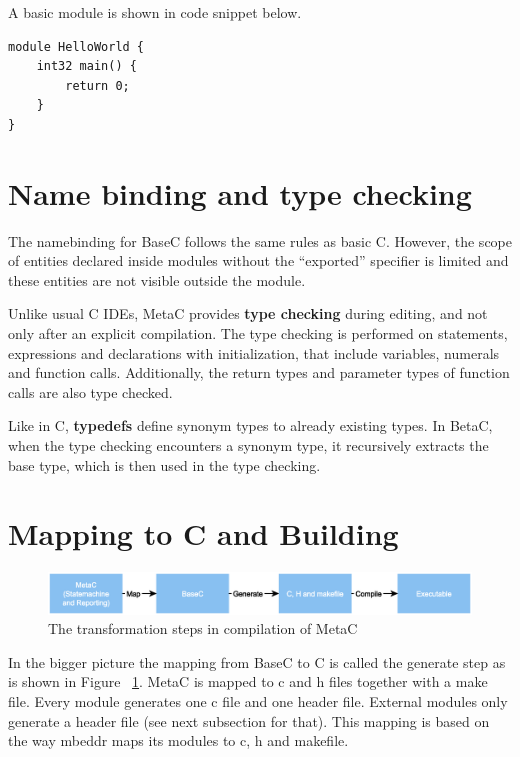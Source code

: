 \documentclass[a4paper,10pt,titlepage]{report}
\begin{document}
A basic module is shown in code snippet below.

\begin{lstlisting}
module HelloWorld {
    int32 main() {
        return 0;
    }
}
\end{lstlisting}



\section{Name binding and type checking}
The namebinding for BaseC follows the same rules as basic C. However, the scope of entities declared inside modules without the “exported” specifier is limited and these entities are not visible outside the module.

Unlike usual C IDEs, MetaC provides \textbf{type checking} during editing, and not only after an explicit compilation. The type checking is performed on statements, expressions and declarations with initialization, that include variables, numerals and function calls. Additionally, the return types and parameter types of function calls are also type checked.

Like in C, \textbf{typedefs} define synonym types to already existing types. In BetaC, when the type checking encounters a synonym type, it recursively extracts the base type, which is then used in the type checking.
 

\section{Mapping to C and Building}

\begin{figure}[ht!]
\centering
\includegraphics[width=\linewidth]{pics/compilation_simple.eps}
\caption{The transformation steps in compilation of MetaC}
\label{fig:compilation_simple}
\end{figure}

In the bigger picture the mapping from BaseC to C is called the generate step as is shown in Figure ~\ref{fig:compilation_simple}. MetaC is mapped to c and h files together with a make file. Every module generates one c file and one header file. External modules only generate a header file (see next subsection for that). This mapping is based on the way mbeddr maps its modules to c, h and makefile.
\end{document}
